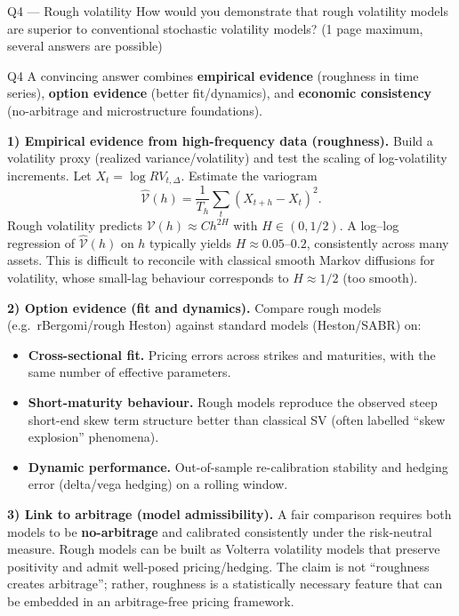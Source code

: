 \begin{questionbox}{Q4 --- Rough volatility}
How would you demonstrate that rough volatility models are superior to conventional stochastic volatility models? (1 page maximum, several answers are possible)
\end{questionbox}

\begin{solutionbox}{Q4}
A convincing answer combines \textbf{empirical evidence} (roughness in time series), \textbf{option evidence} (better fit/dynamics), and \textbf{economic consistency} (no-arbitrage and microstructure foundations).

\medskip
\textbf{1) Empirical evidence from high-frequency data (roughness).} Build a volatility proxy (realized variance/volatility) and test the scaling of log-volatility increments. Let \(X_t=\log RV_{t,\Delta}\). Estimate the variogram
\[
\widehat{\mathcal V}(h)=\frac{1}{T_h}\sum_t (X_{t+h}-X_t)^2.
\]
Rough volatility predicts \(\mathcal V(h)\approx C h^{2H}\) with \(H\in(0,1/2)\). A log--log regression of \(\widehat{\mathcal V}(h)\) on \(h\) typically yields \(H\approx 0.05\)--\(0.2\), consistently across many assets. This is difficult to reconcile with classical smooth Markov diffusions for volatility, whose small-lag behaviour corresponds to \(H\approx 1/2\) (too smooth).

\medskip
\textbf{2) Option evidence (fit and dynamics).} Compare rough models (e.g.\ rBergomi/rough Heston) against standard models (Heston/SABR) on:
\begin{itemize}[leftmargin=*]
  \item \textbf{Cross-sectional fit.} Pricing errors across strikes and maturities, with the same number of effective parameters.
  \item \textbf{Short-maturity behaviour.} Rough models reproduce the observed steep short-end skew term structure better than classical SV (often labelled ``skew explosion'' phenomena).
  \item \textbf{Dynamic performance.} Out-of-sample re-calibration stability and hedging error (delta/vega hedging) on a rolling window.
\end{itemize}

\medskip
\textbf{3) Link to arbitrage (model admissibility).} A fair comparison requires both models to be \textbf{no-arbitrage} and calibrated consistently under the risk-neutral measure. Rough models can be built as Volterra volatility models that preserve positivity and admit well-posed pricing/hedging. The claim is not ``roughness creates arbitrage''; rather, roughness is a statistically necessary feature that can be embedded in an arbitrage-free pricing framework.


\end{solutionbox}
